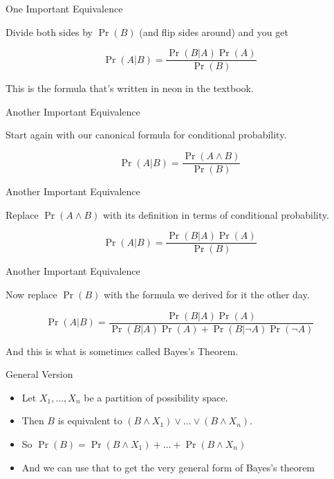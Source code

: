 \documentclass[
  ignorenonframetext,
]{beamer}
\providecommand{\tightlist}{%
  \setlength{\itemsep}{0pt}\setlength{\parskip}{0pt}}
\renewcommand{\,}{\text{, }}
\begin{document}
\begin{frame}{One Important Equivalence}
\protect\hypertarget{one-important-equivalence-1}{}

Divide both sides by \(\Pr(B)\) (and flip sides around) and you get

\[
\Pr(A | B) = \frac{\Pr(B | A) \Pr(A)}{\Pr(B)}
\]

\pause

This is the formula that's written in neon in the textbook.

\end{frame}

\begin{frame}{Another Important Equivalence}
\protect\hypertarget{another-important-equivalence}{}

Start again with our canonical formula for conditional probability.

\[
\Pr(A | B) = \frac{\Pr(A \wedge B)}{\Pr(B)}
\]

\end{frame}

\begin{frame}{Another Important Equivalence}
\protect\hypertarget{another-important-equivalence-1}{}

Replace \(\Pr(A \wedge B)\) with its definition in terms of conditional
probability.

\[
\Pr(A | B) = \frac{\Pr(B | A)\Pr(A)}{\Pr(B)}
\]

\end{frame}

\begin{frame}{Another Important Equivalence}
\protect\hypertarget{another-important-equivalence-2}{}

Now replace \(\Pr(B)\) with the formula we derived for it the other day.

\[
\Pr(A | B) = \frac{\Pr(B | A)\Pr(A)}{\Pr(B | A)\Pr(A) + \Pr(B | \neg A)\Pr(\neg A)}
\]

And this is what is sometimes called Bayes's Theorem.

\end{frame}

\begin{frame}{General Version}
\protect\hypertarget{general-version}{}

\begin{itemize}
\tightlist
\item
  Let \(X_1, \dots, X_n\) be a partition of possibility space.
\item
  Then \(B\) is equivalent to
  \((B \wedge X_1) \vee \dots \vee (B \wedge X_n)\).
\item
  So \(\Pr(B) = \Pr(B \wedge X_1) + \dots + \Pr(B \wedge X_n)\)
\item
  And we can use that to get the very general form of Bayes's theorem
\end{itemize}

\end{frame}
\end{document}
